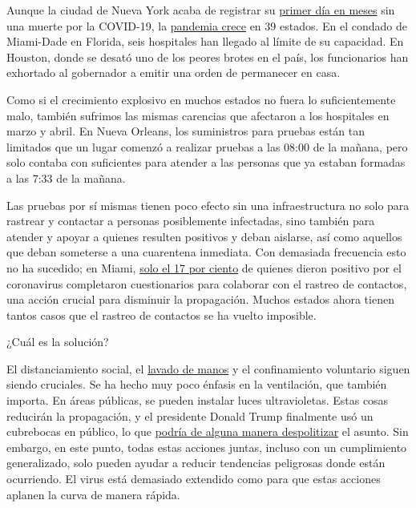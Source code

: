Aunque la ciudad de Nueva York acaba de registrar su
\href{https://www.npr.org/sections/coronavirus-live-updates/2020/07/13/890427225/nyc-has-its-first-day-in-months-with-no-covid-19-deaths}{primer
día en meses} sin una muerte por la COVID-19, la
\href{https://www.nytimes.com/es/interactive/2020/espanol/mundo/coronavirus-en-estados-unidos.html}{pandemia
crece} en 39 estados. En el condado de Miami-Dade en Florida, seis
hospitales han llegado al límite de su capacidad. En Houston, donde se
desató uno de los peores brotes en el país, los funcionarios han
exhortado al gobernador a emitir una orden de permanecer en casa.

Como si el crecimiento explosivo en muchos estados no fuera lo
suficientemente malo, también sufrimos las mismas carencias que
afectaron a los hospitales en marzo y abril. En Nueva Orleans, los
suministros para pruebas están tan limitados que un lugar comenzó a
realizar pruebas a las 08:00 de la mañana, pero solo contaba con
suficientes para atender a las personas que ya estaban formadas a las
7:33 de la mañana.

Las pruebas por sí mismas tienen poco efecto sin una infraestructura no
solo para rastrear y contactar a personas posiblemente infectadas, sino
también para atender y apoyar a quienes resulten positivos y deban
aislarse, así como aquellos que deban someterse a una cuarentena
inmediata. Con demasiada frecuencia esto no ha sucedido; en Miami,
\href{https://miami.cbslocal.com/2020/07/09/mayors-coalition-wants-more-contact-tracers-miami-dade-county/}{solo
el 17 por ciento} de quienes dieron positivo por el coronavirus
completaron cuestionarios para colaborar con el rastreo de contactos,
una acción crucial para disminuir la propagación. Muchos estados ahora
tienen tantos casos que el rastreo de contactos se ha vuelto imposible.

¿Cuál es la solución?

El distanciamiento social, el
\href{https://www.nytimes.com/es/2020/03/19/espanol/ciencia-y-tecnologia/como-lavarse-las-manos-coronavirus.html}{lavado
de manos} y el confinamiento voluntario siguen siendo cruciales. Se ha
hecho muy poco énfasis en la ventilación, que también importa. En áreas
públicas, se pueden instalar luces ultravioletas. Estas cosas reducirán
la propagación, y el presidente Donald Trump finalmente usó un
cubrebocas en público, lo que
\href{https://www.nytimes.com/es/2020/06/11/espanol/opinion/coronavirus-economia-krugman.html}{podría
de alguna manera despolitizar} el asunto. Sin embargo, en este punto,
todas estas acciones juntas, incluso con un cumplimiento generalizado,
solo pueden ayudar a reducir tendencias peligrosas donde están
ocurriendo. El virus está demasiado extendido como para que estas
acciones aplanen la curva de manera rápida.

